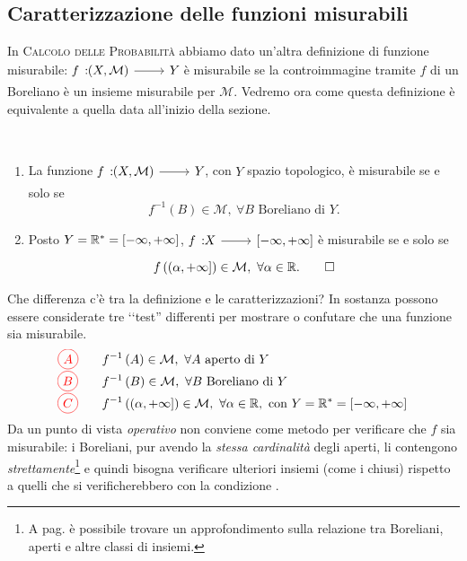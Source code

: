 \subsection{Caratterizzazione delle funzioni misurabili}
In \textsc{Calcolo delle Probabilità} abbiamo dato un'altra definizione di funzione misurabile: $\funz{f}{\left(X,\mathcal{M}\right)}{Y}$ è misurabile se la controimmagine tramite $f$ di un Boreliano è un insieme misurabile per $\mathcal{M}$. Vedremo ora come questa definizione è equivalente a quella data all'inizio della sezione.
\begin{theoremasqed}~
	\begin{enumerate}\label{caratterizzazionefunzionimisurabili}
		\item La funzione $\funz{f}{\left(X,\mathcal{M}\right)}{Y}$, con $Y$ spazio topologico, è  misurabile se e solo se
		\begin{equation}
			f^{-1}\left(B\right)\in\mathcal{M},\ \forall B \text{ Boreliano di } Y.
		\end{equation}
		\item Posto $Y=\mathbb{R}^{\ast}=\left[-\infty,+\infty\right]$, $\funz{f}{X}{\left[-\infty,+\infty\right]}$ è misurabile se e solo se
		\begin{equation}
			f\left(\left(\alpha,+\infty\right]\right)\in\mathcal{M},\ \forall \alpha\in\realset.\qedhere
		\end{equation}
	\end{enumerate}
\end{theoremasqed}
Che differenza c'è tra la definizione e le caratterizzazioni? In sostanza possono essere considerate tre ‘‘test'' differenti per mostrare o confutare che una funzione sia misurabile.
\begin{align*}
	\circled[red]{A}&\qquad f^{-1}\left(A\right)\in\mathcal{M},\ \forall A\text{ aperto di }Y\\
	\circled[red]{B}&\qquad f^{-1}\left(B\right)\in\mathcal{M},\ \forall B\text{ Boreliano di }Y\\
	\circled[red]{C}&\qquad f^{-1}\left(\left(\alpha,+\infty\right]\right)\in\mathcal{M},\ \forall \alpha\in\realset,\ \text{con }Y=\realset^{\ast}=\left[-\infty,+\infty\right]
\end{align*}
Da un punto di vista \textit{operativo}  non conviene come metodo per verificare che $f$ sia misurabile: i Boreliani, pur avendo la \textit{stessa cardinalità} degli aperti, li contengono \textit{strettamente}\footnote{A pag. \pageref{famigliediinsiemi} è possibile trovare un approfondimento sulla relazione tra Boreliani, aperti e altre classi di insiemi.} e quindi bisogna verificare ulteriori insiemi (come i chiusi) rispetto a quelli che si verificherebbero con la condizione .\\

